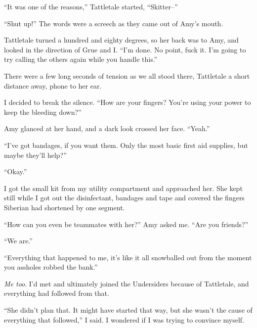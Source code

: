 ``It was one of the reasons,'' Tattletale started, ``Skitter--''



``Shut up!''  The words were a screech as they came out of Amy's mouth.



Tattletale turned a hundred and eighty degrees, so her back was to Amy, and looked in the direction of Grue and I.  ``I'm done.  No point, fuck it.  I'm going to try calling the others again while you handle this.''



There were a few long seconds of tension as we all stood there, Tattletale a short distance away, phone to her ear.



I decided to break the silence.  ``How are your fingers?  You're using your power to keep the bleeding down?''



Amy glanced at her hand, and a dark look crossed her face.  ``Yeah.''



``I've got bandages, if you want them.  Only the most basic first aid supplies, but maybe they'll help?''



``Okay.''



I got the small kit from my utility compartment and approached her.  She kept still while I got out the disinfectant, bandages and tape and covered the fingers Siberian had shortened by one segment.



``How can you even be teammates with her?''  Amy asked me.  ``Are you friends?''



``We are.''



``Everything that happened to me, it's like it all snowballed out from the moment you assholes robbed the bank.''



\emph{Me too}.  I'd met and ultimately joined the Undersiders because of Tattletale, and everything had followed from that.



``She didn't plan that.  It might have started that way, but she wasn't the cause of everything that followed,'' I said.  I wondered if I was trying to convince myself.



